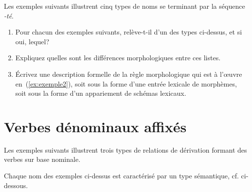 Les exemples suivants illustrent cinq types de noms se terminant par la séquence \emph{-té}.

\vspace{-.5\baselineskip}
\begin{exe}
\ex   \begin{xlist}
\ex \absurditeexdeux 
\ex \label{ex:exemple2} \adaptabiliteexdeux
\ex \biodiversiteexdeux
\ex \bonteexdeux
\ex \pariteexdeux
\end{xlist}
\end{exe}

\begin{enumerate}
\item Pour chacun des exemples suivants, relève-t-il d'un des types ci-dessus, et si oui, lequel?
\begin{exe}
\ex \aclasserexdeux
\end{exe}
\item Expliquez quelles sont les différences morphologiques entre ces listes.

\item Écrivez une description formelle de la règle morphologique qui est à l'œuvre en~(\ref{ex:exemple2}), soit sous la forme d'une entrée lexicale de morphèmes, soit sous la forme d'un appariement de schémas lexicaux.
\end{enumerate}


\section{Verbes dénominaux affixés}

Les exemples suivants illustrent trois types de relations de dérivation formant des verbes sur base nominale. 

\vspace{-.5\baselineskip}
\begin{exe}
\ex \label{ex:exemple31}\begin{xlist}
\ex \panifierextrois  
\ex  \embrasserextrois
\ex \vampiriserextrois
\end{xlist}
\end{exe}

Chaque nom des exemples ci-dessus est caractérisé par un type sémantique, cf. ci-dessous.


\vspace{-.5\baselineskip}
\begin{exe}
\ex \label{ex:exemple32} \begin{xlist}
\ex \painextroisbis
\ex \label{ex:exemple3}\brasextroisbis
\ex \vampireextroisbis
\end{xlist}
\end{exe}


